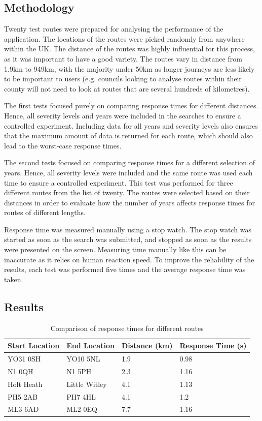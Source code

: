 \documentclass[authoryearcitations]{UoYCSproject}
\begin{document}
\subsection{Methodology}

Twenty test routes were prepared for analysing the performance of the application. The locations of the routes were picked randomly from anywhere within the UK. The distance of the routes was highly influential for this process, as it was important to have a good variety. The routes vary in distance from 1.9km to 949km, with the majority under 50km as longer journeys are less likely to be important to users (e.g. councils looking to analyse routes within their county will not need to look at routes that are several hundreds of kilometres).

The first tests focused purely on comparing response times for different distances. Hence, all severity levels and years were included in the searches to ensure a controlled experiment. Including data for all years and severity levels also ensures that the maximum amount of data is returned for each route, which should also lead to the worst-case response times. 

The second tests focused on comparing response times for a different selection of years. Hence, all severity levels were included and the same route was used each time to ensure a controlled experiment. This test was performed for three different routes from the list of twenty. The routes were selected based on their distances in order to evaluate how the number of years affects response times for routes of different lengths.

Response time was measured manually using a stop watch. The stop watch was started as soon as the search was submitted, and stopped as soon as the results were presented on the screen. Measuring time manually like this can be inaccurate as it relies on human reaction speed. To improve the reliability of the results, each test was performed five times and the average response time was taken.

\subsection{Results}

\begin{table}
	\center
	\caption{Comparison of response times for different routes}
	\label{tab:performanceresults1}
	\begin{tabular}{| l | l | l | l |}
	\hline
	\textbf{Start Location} & \textbf{End Location} & \textbf{Distance (km)} & \textbf{Response Time (s)} \\ \hline
	YO31 0SH & YO10 5NL & 1.9 & 0.98 \\ \hline
	N1 0QH & N1 5PH & 2.3 & 1.16 \\ \hline
	Holt Heath & Little Witley & 4.1 & 1.13 \\ \hline
	PH5 2AB & PH7 4HL & 4.1 & 1.2 \\ \hline
	ML3 6AD & ML2 0EQ & 7.7 & 1.16 \\ \hline 
	\end{tabular}
\end{table}
\end{document}
